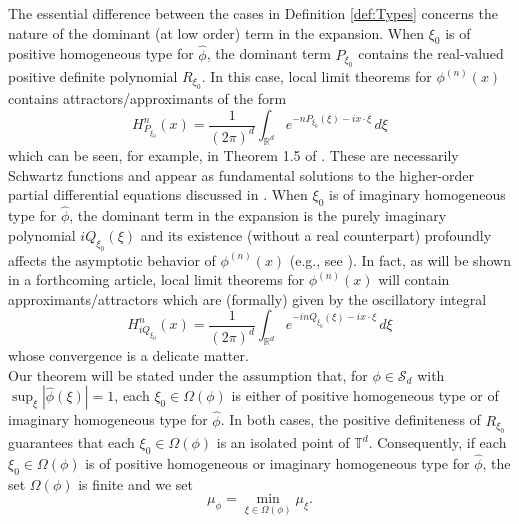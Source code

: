 \documentclass[11pt, letter]{book}
\begin{document}
\noindent The essential difference between the cases in Definition \ref{def:Types} 
concerns the nature of the dominant (at low order) term in the expansion. When $\xi_0$ is of positive homogeneous type for $\widehat{\phi}$, the dominant term $P_{\xi_0}$ contains the real-valued positive definite polynomial $R_{\xi_0}$. In this case, local limit theorems for $\phi^{(n)}(x)$ contains attractors/approximants of the form
\begin{equation*}
    H^n_{P_{\xi_0}}(x)=\frac{1}{(2\pi)^d}\int_{\mathbb{R}^d}e^{-nP_{\xi_0}(\xi)-ix\cdot\xi}\,d\xi
\end{equation*}
which can be seen, for example, in Theorem 1.5 of \cite{randles_convolution_2017}. These are necessarily Schwartz functions and appear as fundamental solutions to the higher-order partial differential equations discussed in \cite{randles_positive-homogeneous_2017}. When $\xi_0$ is of imaginary homogeneous type for $\widehat{\phi}$, the dominant term in the expansion is the purely imaginary polynomial $iQ_{\xi_0}(\xi)$ and its existence (without a real counterpart) profoundly affects the asymptotic behavior of $\phi^{(n)}(x)$ (e.g., see \cite{randles_convolution_2015}). In fact, as will be shown in a forthcoming article, local limit theorems for $\phi^{(n)}(x)$ will contain approximants/attractors which are (formally) given by the oscillatory integral
\begin{equation*}
    H_{iQ_{\xi_0}}^{n}(x)=\frac{1}{(2\pi)^d}\int_{\mathbb{R}^d}e^{-inQ_{\xi_0}(\xi)-ix\cdot \xi}\,d\xi
\end{equation*}
whose convergence is a delicate matter.\\






\noindent Our theorem will be stated under the assumption that, for $\phi\in\mathcal{S}_d$ with $\sup_\xi|\widehat{\phi}(\xi)|=1$, each $\xi_0\in\Omega(\phi)$ is either of positive homogeneous type or of imaginary homogeneous type for $\widehat{\phi}$. In both cases, the positive definiteness of $R_{\xi_0}$ guarantees that each $\xi_0\in\Omega(\phi)$ is an isolated point of $\mathbb{T}^d$. Consequently, if each $\xi_0\in\Omega(\phi)$ is of positive homogeneous or imaginary homogeneous type for $\widehat{\phi}$, the set $\Omega(\phi)$ is finite and we set
\begin{equation*}
    \mu_{\phi}=\min_{\xi\in\Omega(\phi)}\mu_{\xi}.
\end{equation*}
\end{document}
